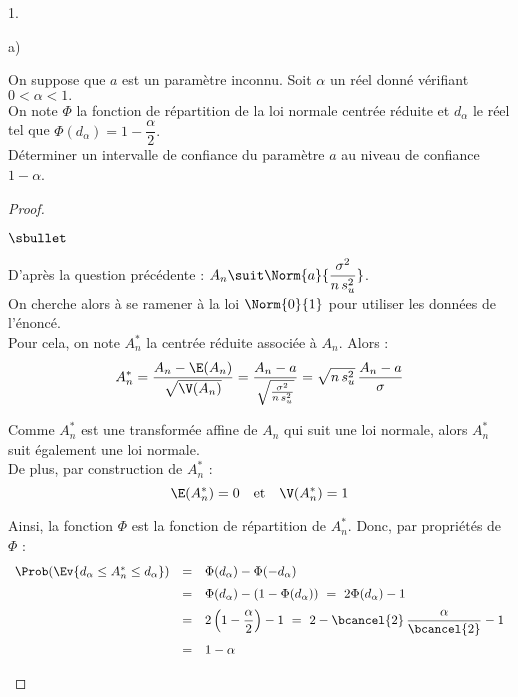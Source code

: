 \documentclass[11pt]{article}%
\begin{document}
\begin{noliste}{1.}
\begin{noliste}{a)}
  
  \item On suppose que $a$ est un paramètre inconnu. Soit $\alpha$ un 
  réel donné vérifiant $0 < \alpha < 1.$\\
  On note $\Phi$ la fonction de répartition de la loi normale centrée 
  réduite et $d_\alpha$ le réel tel que $\Phi(d_\alpha) = 
  1-\dfrac{\alpha}{2}.$\\
  Déterminer un intervalle de confiance du paramètre $a$ au niveau de 
  confiance $1-\alpha$.
  
  \begin{proof}~
   \begin{noliste}{$\sbullet$}
    \item D'après la question précédente : $A_n \suit 
    \Norm{a}{\dfrac{\sigma^2}{n \, s_u^2}}$.\\
    On cherche alors à se ramener à la loi $\Norm{0}{1}$ pour 
    utiliser les données de l'énoncé.\\
    Pour cela, on note $A_n^*$ la \var centrée réduite associée à 
    $A_n$. Alors :
    \[
     A_n^* = \dfrac{A_n - \E(A_n)}{\sqrt{\V(A_n)}} = 
     \dfrac{A_n -a}{\sqrt{\frac{\sigma^2}{n \, s_u^2}}}
     = \sqrt{n \, s_u^2} \, \dfrac{A_n - a}{\sigma}
    \]
    
    \item Comme $A_n^*$ est une transformée affine de $A_n$ qui suit
    une loi normale, alors $A_n^*$ suit également une loi normale.\\
    De plus, par construction de $A_n^*$ :
    \[
     \E(A_n^*)=0 \quad \mbox{et} \quad \V(A_n^*)=1 
    \]
    
    \item Ainsi, la fonction $\Phi$ est la fonction de répartition 
    de $A_n^*$. Donc, par propriétés de $\Phi$ :
    \[
     \begin{array}{rcl}
      \Prob(\Ev{d_\alpha \leq A_n^* \leq d_\alpha}) &=& 
      \Phi(d_\alpha) - \Phi(-d_\alpha)
      \\[.2cm]
      &=& \Phi(d_\alpha) -(1- \Phi(d_\alpha)) \ = \
      2 \Phi(d_\alpha) -1
      \\[.2cm]
      &=& 2\left(1- \dfrac{\alpha}{2}\right) -1 \ = \
      2 - \bcancel{2} \, \dfrac{\alpha}{\bcancel{2}} -1
      \\[.4cm]
      &=& 1 - \alpha
     \end{array}
    \]
       

\end{noliste}
\end{proof}
\end{noliste}
\end{noliste}
\end{document}
